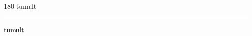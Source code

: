 
\begin{frame}
\begin{center}
\begin{turn}{180}
{\fontsize{2.5cm}{1em}\selectfont tumult}
\end{turn}
\vspace{1em}\par  
\hrule
\vspace{1em}\par  
{\fontsize{2.5cm}{1em}\selectfont tumult}
\end{center}
\end{frame}
